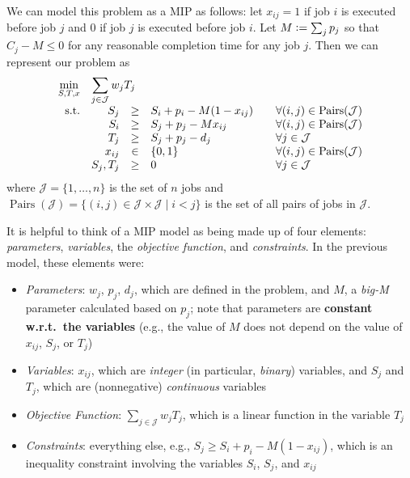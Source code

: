 \documentclass[12pt]{article}
\begin{document}
We can model this problem as a MIP as follows: let $x_{ij} = 1$ if job $i$ is executed before job $j$ and $0$ if job $j$ is executed before job $i$. Let $M \mathrel{\mathop:}= \sum_j p_j$ so that $C_j - M \le 0$ for any reasonable completion time for any job $j$. Then we can represent our problem as
\begin{equation*}
\begin{array}{rrclcl}
    \displaystyle \min_{S, T, x} & \multicolumn{3}{l}{\displaystyle \sum_{j \in \mathcal{J}} w_j T_j} \\
    \textrm{s.t.} & S_j & \ge & S_i + p_i - M(1 - x_{ij}) && \forall (i, j) \in \operatorname{Pairs}(\mathcal{J}) \\
    & S_i & \ge & S_j + p_j - Mx_{ij} && \forall (i, j) \in \operatorname{Pairs}(\mathcal{J}) \\
    & T_j & \ge & S_j + p_j - d_j && \forall j \in \mathcal{J} \\
    & x_{ij} & \in & \{0,1\} && \forall (i,j) \in \operatorname{Pairs}(\mathcal{J}) \\
    & S_j, T_j & \ge & 0 && \forall j \in \mathcal{J}
\end{array}
\end{equation*}
where $\mathcal{J} = \{1, \dots, n\}$ is the set of $n$ jobs and $\operatorname{Pairs}(\mathcal{J}) = \{(i,j) \in \mathcal{J} \times \mathcal{J} \mid i < j\}$ is the set of all pairs of jobs in $\mathcal{J}$.

It is helpful to think of a MIP model as being made up of four elements: \emph{parameters}, \emph{variables}, the \emph{objective function}, and \emph{constraints}. In the previous model, these elements were:
\begin{itemize}
    \item \emph{Parameters}: $w_j$, $p_j$, $d_j$, which are defined in the problem, and $M$, a \emph{big-M} parameter calculated based on $p_j$; note that parameters are \textbf{constant w.r.t.~the variables} (e.g., the value of $M$ does not depend on the value of $x_{ij}$, $S_j$, or $T_j$)
    \item \emph{Variables}: $x_{ij}$, which are \emph{integer} (in particular, \emph{binary}) variables, and $S_j$ and $T_j$, which are (nonnegative) \emph{continuous} variables
    \item \emph{Objective Function}: $\sum_{j \in \mathcal{J}} w_j T_j$, which is a linear function in the variable $T_j$
    \item \emph{Constraints}: everything else, e.g., $S_j \ge S_i + p_i - M(1 - x_{ij})$, which is an inequality constraint involving the variables $S_i$, $S_j$, and $x_{ij}$
\end{itemize}
\end{document}
